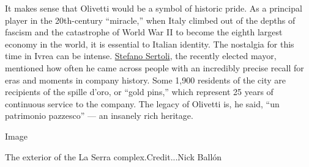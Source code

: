 It makes sense that Olivetti would be a symbol of historic pride. As a
principal player in the 20th-century ``miracle,'' when Italy climbed out
of the depths of fascism and the catastrophe of World War II to become
the eighth largest economy in the world, it is essential to Italian
identity. The nostalgia for this time in Ivrea can be intense.
\href{https://www.comune.ivrea.to.it/entra-in-comune/amministrazione-trasparente/organizzazione/articolazione-degli-uffici/item/stefano-sertoli.html}{Stefano
Sertoli}, the recently elected mayor, mentioned how often he came across
people with an incredibly precise recall for eras and moments in company
history. Some 1,900 residents of the city are recipients of the spille
d'oro, or ``gold pins,'' which represent 25 years of continuous service
to the company. The legacy of Olivetti is, he said, ``un patrimonio
pazzesco'' --- an insanely rich heritage.

Image

The exterior of the La Serra complex.Credit...Nick Ballón

